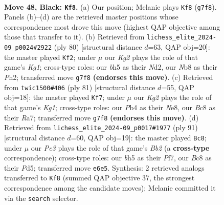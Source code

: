 \documentclass[11pt]{article}
\begin{document}
\clearpage

\begin{figure}[p]\centering
\begin{subfigure}{0.46\textwidth}\centering
\resizebox{\linewidth}{!}{%
\newchessgame
\chessboard[
  setfen={1nb5/rp2n1k1/4p3/5p1B/PpN2P2/1P4PN/5K1P/7R b - - 4 48},
  showmover=false,
  pgfstyle=straightmove, color=movearrow, markmove={g7-f8}
]}
\caption{}
\end{subfigure}\hfill
\begin{subfigure}{0.46\textwidth}\centering
\resizebox{\linewidth}{!}{%
\newchessgame
\chessboard[
  setfen={8/4r1kp/1NR3p1/p3pp2/P7/n3PPPb/3N3P/6K1 w - - 1 41},
  showmover=false,
  pgfstyle=straightmove, color=movearrow, markmove={g1-f2}
]}
\caption{}
\end{subfigure}
\\[4pt]
\begin{subfigure}{0.46\textwidth}\centering
\resizebox{\linewidth}{!}{%
\newchessgame
\chessboard[
  setfen={4n1k1/r2b2p1/5p1p/8/2p1PB2/2P2P2/1R2NKPP/8 b - - 3 41},
  showmover=false,
  pgfstyle=straightmove, color=movearrow, markmove={g8-f7}
]}
\caption{}
\end{subfigure}\hfill
\begin{subfigure}{0.46\textwidth}\centering
\resizebox{\linewidth}{!}{%
\newchessgame
\chessboard[
  setfen={6k1/1b3p2/1p4p1/1P1p3p/1Bn5/4PNPP/5P2/6K1 b - - 2 46},
  showmover=false,
  pgfstyle=straightmove, color=movearrow, markmove={b7-c8}
]}
\caption{}
\end{subfigure}
\caption{\textbf{Move 48, Black: \texttt{Kf8}.} (a) Our position; Melanie plays \texttt{Kf8} (\texttt{g7f8}). Panels (b)--(d) are the retrieved master positions whose correspondence most drove this move (highest QAP objective among those that transfer to it). (b) Retrieved from \texttt{lichess\_elite\_2024-09\_p0024\#2922} (ply 80) [structural distance $d$=63, QAP obj=20]: the master played \texttt{Kf2}; under $\mu$ our \emph{Kg2} plays the role of that game's \emph{Kg1}; cross-type roles: our \emph{b}h5 as their \emph{N}d2, our \emph{N}b8 as their \emph{P}h2; transferred move \texttt{g7f8} \textbf{(endorses this move)}. (c) Retrieved from \texttt{twic1500\#406} (ply 81) [structural distance $d$=55, QAP obj=18]: the master played \texttt{Kf7}; under $\mu$ our \emph{Kg2} plays the role of that game's \emph{Kg1}; cross-type roles: our \emph{P}b4 as their \emph{N}e8, our \emph{B}c8 as their \emph{R}a7; transferred move \texttt{g7f8} \textbf{(endorses this move)}. (d) Retrieved from \texttt{lichess\_elite\_2024-09\_p0017\#1977} (ply 91) [structural distance $d$=60, QAP obj=19]: the master played \texttt{Bc8}; under $\mu$ our \emph{Pe3} plays the role of that game's \emph{Bb2} (a \textbf{cross-type} correspondence); cross-type roles: our \emph{b}h5 as their \emph{P}f7, our \emph{B}c8 as their \emph{P}d5; transferred move \texttt{e6e5}. Synthesis: 2 retrieved analogs transferred to \texttt{Kf8} (summed QAP objective 37, the strongest correspondence among the candidate moves); Melanie committed it via the \texttt{search} selector.}
\label{fig:thought-m95}
\end{figure}
\end{document}
